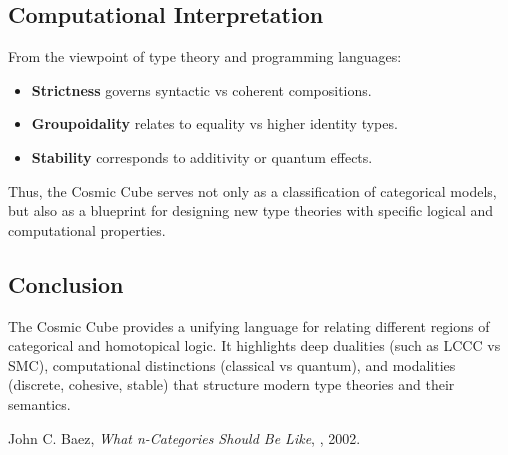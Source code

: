 \documentclass{article}
\begin{document}
\subsection{Computational Interpretation}

From the viewpoint of type theory and programming languages:

\begin{itemize}
\item \textbf{Strictness} governs syntactic vs coherent compositions.
\item \textbf{Groupoidality} relates to equality vs higher identity types.
\item \textbf{Stability} corresponds to additivity or quantum effects.
\end{itemize}

Thus, the Cosmic Cube serves not only as a classification of categorical models, but also as a blueprint for designing new type theories with specific logical and computational properties.

\subsection{Conclusion}

The Cosmic Cube provides a unifying language for relating different regions of categorical and homotopical logic. It highlights deep dualities (such as LCCC vs SMC), computational distinctions (classical vs quantum), and modalities (discrete, cohesive, stable) that structure modern type theories and their semantics.

\begin{thebibliography}{9}
 John C. Baez, \emph{What n-Categories Should Be Like}, , 2002.
\end{thebibliography}
\end{document}
